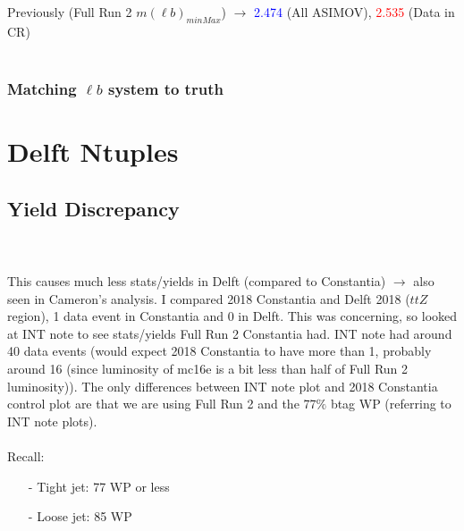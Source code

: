 \documentclass[]{article}
\begin{document}
\begin{figure}[!h]
\begin{subfigure}[b]{0.4\textwidth}
	\end{subfigure}
\end{figure}
\\\\
\\\\
Previously (Full Run 2 $m(\ell b)_{minMax}$) $\rightarrow$ \textcolor{blue}{2.474} (All ASIMOV), \textcolor{red}{2.535} (Data in CR)
\\\\

\subsubsection{Matching $\ell b$ system to truth}



\section{Delft Ntuples}
\subsection{Yield Discrepancy}
 \\\\
This causes much less stats/yields in Delft (compared to Constantia) $\rightarrow$ also seen in Cameron's analysis. I compared 2018 Constantia and Delft 2018 ($ttZ$ region), 1 data event in Constantia and 0 in Delft. This was concerning, so looked at INT note to see stats/yields Full Run 2 Constantia had. INT note had around 40 data events (would expect 2018 Constantia to have more than 1, probably around 16 (since luminosity of mc16e is a bit less than half of Full Run 2 luminosity)). The only differences between INT note plot and 2018 Constantia control plot are that we are using Full Run 2 and the 77$\%$ btag WP (referring to INT note plots).\\\\
Recall:
\begin{itemize}
	\item[-] Tight jet: 77 WP or less
	\item[-] Loose jet: 85 WP
\end{itemize}
\end{document}
